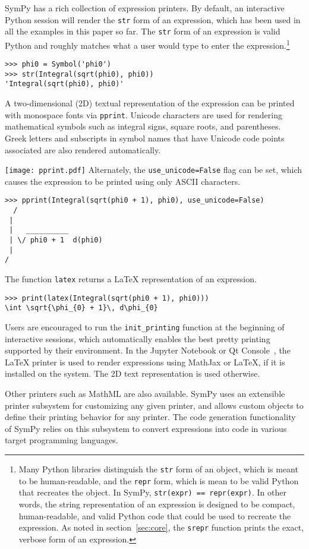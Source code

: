 SymPy has a rich collection of expression printers. By default, an interactive
Python session will render the \verb|str| form of an expression, which has
been used in all the examples in this paper so far. The \verb|str| form of an
expression is valid Python and roughly matches what a user would type to enter
the expression.\footnote{\label{note:repr}Many Python libraries distinguish the \texttt{str}
  form of an object, which is meant to be human-readable, and the
  \texttt{repr} form, which is mean to be valid Python that recreates the
  object. In SymPy, \texttt{str(expr) == repr(expr)}. In other words, the
  string representation of an expression is designed to be compact,
  human-readable, and valid Python code that could be used to recreate the
  expression. As noted in section~\ref{sec:core}, the \texttt{srepr}
  function prints the exact, verbose form of an expression.}

\begin{verbatim}
>>> phi0 = Symbol('phi0')
>>> str(Integral(sqrt(phi0), phi0))
'Integral(sqrt(phi0), phi0)'
\end{verbatim}

A two-dimensional (2D) textual representation of the expression can
be printed with monospace fonts via \verb|pprint|.
Unicode characters are used for rendering mathematical symbols such as integral signs,
square roots, and parentheses. Greek letters and subscripts in symbol names
that have Unicode code points associated
are also rendered automatically.

\noindent
\texttt{[image: pprint.pdf]}
Alternately, the \verb|use_unicode=False| flag can be set, which causes the
expression to be printed using only ASCII characters.

\begin{verbatim}
>>> pprint(Integral(sqrt(phi0 + 1), phi0), use_unicode=False)
  /
 |
 |   __________
 | \/ phi0 + 1  d(phi0)
 |
/
\end{verbatim}

The function \verb|latex| returns a \LaTeX{} representation of an expression.

\begin{verbatim}
>>> print(latex(Integral(sqrt(phi0 + 1), phi0)))
\int \sqrt{\phi_{0} + 1}\, d\phi_{0}
\end{verbatim}

Users are encouraged to run the \verb|init_printing| function at the beginning
of interactive sessions, which automatically enables the best pretty printing
supported by their environment. In the Jupyter Notebook or Qt
Console~\cite{perez2007ipython}, the \LaTeX{} printer is used to render
expressions using MathJax or \LaTeX{}, if it is installed on the system. The
2D text representation is used otherwise.

Other printers such as MathML are also available. SymPy uses an extensible
printer subsystem for customizing any given
printer, and allows custom objects to define their printing behavior for any
printer. The code generation functionality of SymPy
relies on this subsystem to convert expressions into code in various target
programming languages.

